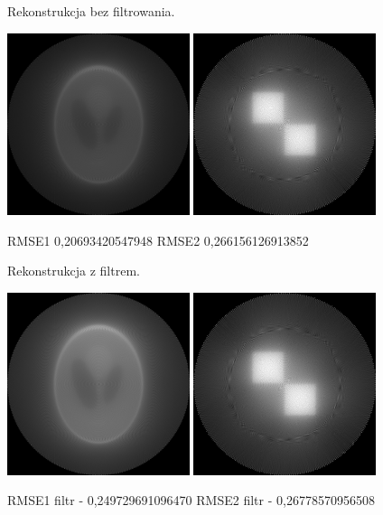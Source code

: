 \documentclass[a4paper, 11pt]{article}
\begin{document}
	\begin{center}
		Rekonstrukcja bez filtrowania.
		
		
		\includegraphics[width=0.4\textwidth]{reconstructed1.png}
		\includegraphics[width=0.4\textwidth]{reconstructed2.png}
		
		RMSE1 0,20693420547948 \hspace{1.5cm} RMSE2 0,266156126913852
		
	\end{center}
	
	
		\begin{center}
		Rekonstrukcja z filtrem.
		
		
		\includegraphics[width=0.4\textwidth]{reconstructed_filtered1.png}
		\includegraphics[width=0.4\textwidth]{reconstructed_filtered2.png}
		
		RMSE1 filtr - 0,249729691096470\hspace{1.5cm} RMSE2 filtr - 0,26778570956508
	\end{center}
	
\end{document}
